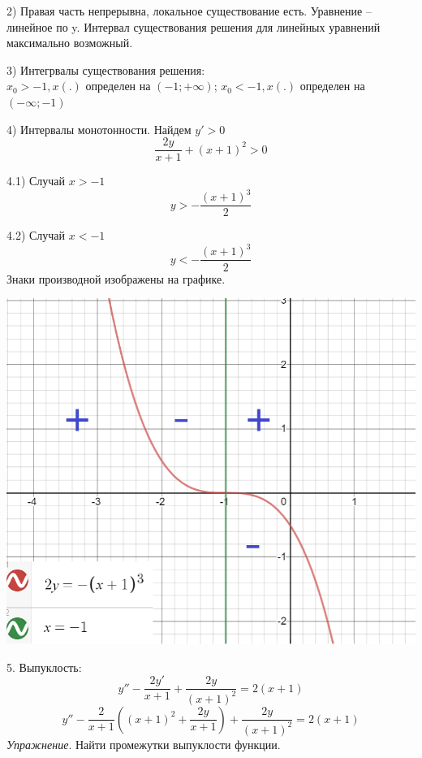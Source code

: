 \documentclass[10pt]{report}
\begin{document}
2) Правая часть непрерывна, локальное существование есть. Уравнение -- линейное по y. Интервал существования решения для линейных уравнений максимально возможный.

3)  Интегрвалы существования решения:\\
$x_0 > -1, x(.) $ определен на $(-1; +\infty)$;  $ x_0 < -1, x(.) $ определен на $(-\infty; -1)$

4) Интервалы монотонности. Найдем $y'>0$\\
\[ \frac {2y} {x+1} +(x+1)^2>0\]

4.1) Случай $x > -1$\\
\begin{equation}
y > - \frac {(x+1)^3} {2} 
\end{equation}

4.2) Случай $ x<-1$
\begin{equation}
y < - \frac {(x+1)^3} {2} 
\end{equation}
Знаки производной изображены на графике.
\begin{center}
{\includegraphics[scale=0.45]{graph4.3.png}} 
\end{center}

5. Выпуклость:\\
\[ y'' - \frac {2y'} {x+1} + \frac {2y} {(x+1)^2} = 2(x+1)\]
\[ y'' - \frac {2} {x+1}\left((x+1)^2+\frac {2y} {x+1}\right) + \frac {2y} {(x+1)^2} = 2(x+1)\]
\textit{Упражнение}. Найти промежутки выпуклости функции.
\end{document}
